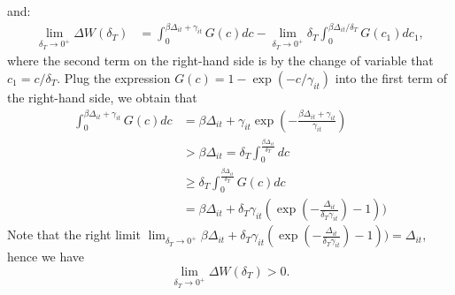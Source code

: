 
and: 
\begin{align*}
    \lim_{\delta_T\rightarrow 0^{+}} \Delta W(\delta_T)& = \int_0^{\beta \Delta_{it}+\gamma_{it}}G(c)dc - \lim_{\delta_T\rightarrow 0^{+}}\delta_T \int_0^{\beta \Delta_{it}/\delta_T}G(c_1)dc_1,
\end{align*}
where the second term on the right-hand side is by the change of variable that $c_1 = c/\delta_T$. Plug the expression $G(c) = 1-\exp(-c/\gamma_{it})$ into the first term  of the right-hand side, we obtain that 
\begin{align*}
    \int_0^{\beta \Delta_{it}+\gamma_{it}}G(c)dc 
        &= \beta \Delta_{it} + \gamma_{it}\exp(-\frac{\beta \Delta_{it}+\gamma_{it}}{\gamma_{it}}) \\
        & > \beta \Delta_{it}  =\delta_T \int_0^\frac{\beta \Delta_{it}}{\delta_T}dc\\
        & \geq \delta_T\int_0^\frac{\beta \Delta_{it}}{\delta_T} G(c)dc \\
        &= \beta \Delta_{it}+\delta_{T}\gamma_{it}(\exp \left(-\frac{\Delta_{it}}{\delta_T\gamma_{it}} \right)-1))
\end{align*}
Note that the right limit $\lim_{\delta_T\rightarrow 0^{+}}\beta \Delta_{it}+\delta_{T}\gamma_{it}(\exp \left(-\frac{\Delta_{it}}{\delta_T\gamma_{it}} \right)-1)) = \Delta_{it}$, hence we have 
\begin{equation*}
    \lim_{\delta_T\rightarrow 0^{+}} \Delta W(\delta_T)>0.
\end{equation*} 


